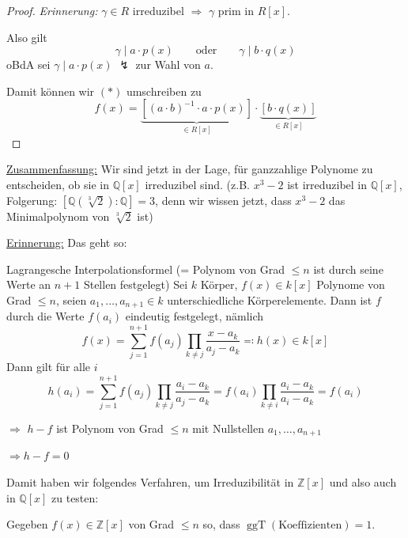 \documentclass[a4paper,12pt,numbers=noenddot,parskip=full]{scrartcl}
\newcommand{\setZ}{\mathbb{Z}}
\newcommand{\setQ}{\mathbb{Q}}
\newcommand{\heading}{\underline}
\theoremstyle{dotless}
\theoremstyle{remark}
\begin{document}
\begin{proof}
		\textit{Erinnerung:} $\gamma \in R$ irreduzibel $\Rightarrow$ $\gamma$ prim in $R[x]$.
		
		Also gilt
		\begin{equation*}
			\gamma \mid a \cdot p(x) \qquad\text{oder}\qquad \gamma \mid b \cdot q(x)
		\end{equation*}
		oBdA sei $\gamma \mid a \cdot p(x)$ $\lightning$ zur Wahl von $a$.
		
		Damit können wir $(*)$ umschreiben zu
		\begin{equation*}
			f(x) = \underbrace{\left[ (a \cdot b)^{-1} \cdot a \cdot p(x) \right]}_{\in R[x]} \cdot \underbrace{\left[ b \cdot q(x) \right]}_{\in R[x]}
		\end{equation*}
	\end{proof}

	\heading{Zusammenfassung:} Wir sind jetzt in der Lage, für ganzzahlige Polynome zu entscheiden, ob sie in $\setQ[x]$ irreduzibel sind. (z.B. $x^3 - 2$ ist irreduzibel in $\setQ[x]$, Folgerung: $[\setQ(\sqrt[3]{2}): \setQ] = 3$, denn wir wissen jetzt, dass $x^3 - 2$ das Minimalpolynom von $\sqrt[3]{2}$ ist)
	
	\heading{Erinnerung:} Das geht so:
	
	Lagrangesche Interpolationsformel (= Polynom von Grad $\leq n$ ist durch seine Werte an $n+1$ Stellen festgelegt) Sei $k$ Körper, $f(x) \in k[x]$ Polynome von Grad $\leq n$, seien $a_1, \dots, a_{n+1} \in k$ unterschiedliche Körperelemente. Dann ist $f$ durch die Werte $f(a_i)$ eindeutig festgelegt, nämlich
	\begin{equation*}
		f(x) = \sum_{j=1}^{n+1} f(a_j) \prod_{k \neq j} \frac{x - a_k}{a_j - a_k} \eqqcolon h(x) \in k[x]
	\end{equation*}
	Dann gilt für alle $i$
	\begin{equation*}
		h(a_i) = \sum_{j = 1}^{n+1} f(a_j) \prod_{k \neq j} \frac{a_i - a_k}{a_j - a_k} = f(a_i) \prod_{k \neq i} \frac{a_i - a_k}{a_i - a_k} = f(a_i)
	\end{equation*}
	
	$\Rightarrow$ $h-f$ ist Polynom von Grad $\leq n$ mit Nullstellen $a_1, \dots, a_{n+1}$
	
	$\Rightarrow h - f = 0$
	
	Damit haben wir folgendes Verfahren, um Irreduzibilität in $\setZ[x]$ und also auch in $\setQ[x]$ zu testen:
	
	Gegeben $f(x) \in \setZ[x]$ von Grad $\leq n$ so, dass $\operatorname{ggT}(\text{Koeffizienten}) = 1$.
	
\end{document}
